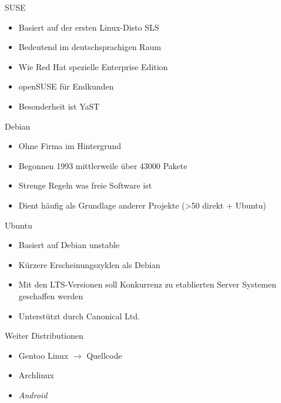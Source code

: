\documentclass[aspectratio=43]{beamer}
\begin{document}
\begin{frame} 

	\begin{block}{SUSE} 
	\begin{itemize}
	\item Basiert auf der ersten Linux-Disto SLS
	\item Bedeutend im deutschsprachigen Raum
	\item Wie Red Hat spezielle Enterprise Edition
	\item openSUSE für Endkunden
	\item Besonderheit ist YaST
	\end{itemize}
	\end{block}

	\begin{block}{Debian} 
	\begin{itemize}
	\item Ohne Firma im Hintergrund
	\item Begonnen 1993 mittlerweile  über 43000 Pakete
	\item Strenge Regeln was freie Software ist
	\item Dient häufig als Grundlage anderer Projekte (>50 direkt + Ubuntu) 
	\end{itemize}
	\end{block}

	
\end{frame}

\begin{frame} 

	\begin{block}{Ubuntu} 
	\begin{itemize}
	\item Basiert auf Debian unstable
	\item Kürzere Erscheinungszyklen als Debian
	\item Mit den LTS-Versionen soll Konkurrenz zu etablierten Server Systemen geschaffen werden
	\item Unterstützt durch Canonical Ltd.
	\end{itemize}
	\end{block}

	\begin{block}{Weiter Distributionen} 
	\begin{itemize}
	\item Gentoo Linux $\rightarrow$ Quellcode
	\item Archlinux
	\item \textit{Android}
	\end{itemize}
	\end{block}

	
\end{frame}
\end{document}

